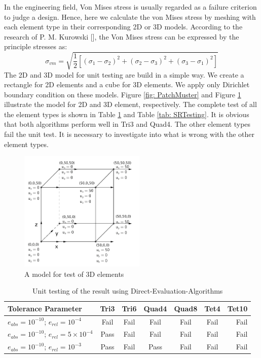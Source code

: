 In the engineering field, Von Mises stress is usually regarded as a failure criterion to judge a design. Hence, here we calculate the von Mises stress by meshing with each element type in their corresponding 2D or 3D models. According to the research of P. M. Kurowski [\cite{VonMiese}], the Von Mises stress can be expressed by the principle stresses as:
\begin{equation}
\sigma_{vm} = \sqrt{\frac{1}{2}\left[\left(\sigma_1 - \sigma_2\right)^2 + \left(\sigma_2 - \sigma_3\right)^2 + \left(\sigma_3 - \sigma_1\right)^2\right]}
\end{equation}
The 2D and 3D model for unit testing are build in a simple way. We create a rectangle for 2D elements and a cube for 3D elements. We apply only Dirichlet boundary condition on these models. Figure \ref{fig: PatchMuster} and Figure \ref{fig: UnitTest3D} illustrate the model for 2D and 3D element, respectively. 
The complete test of all the element types is shown in Table \ref{tab: DirectTesting} and Table \ref{tab: SRTesting}. It is obvious that both algorithms perform well in Tri3 and Quad4. The other element types fail the unit test. It is necessary to investigate into what is wrong with the other element types. 

\begin{figure}
	\begin{center}
		\includegraphics[width=6cm,clip]{UnitTest3D.png} 			
		\caption{A model for test of 3D elements} \label{fig: UnitTest3D}
	\end{center}
\end{figure}

\begin{table} 		
	\caption{Unit testing of the result using Direct-Evaluation-Algorithms}
	\label{tab: DirectTesting}
\begin{tabular}{l*{5}{c}r} 

	Tolerance Parameter              & Tri3 & Tri6 & Quad4 & Quad8 & Tet4  & Tet10  \\
	\hline
	$e_{abs}=10^{-10}$; $e_{rel}=10^{-4}$ & Fail & Fail & Fail & Fail & Fail & Fail   \\
	$e_{abs}=10^{-10}$; $e_{rel}=5\times10^{-4}$&  Pass& Fail & Fail & Fail & Fail &  Fail  \\
	$e_{abs}=10^{-10}$; $e_{rel}=10^{-3}$ & Pass & Fail & Pass & Fail &  Fail & Fail   \\
   \hline
\end{tabular}
\end{table}

